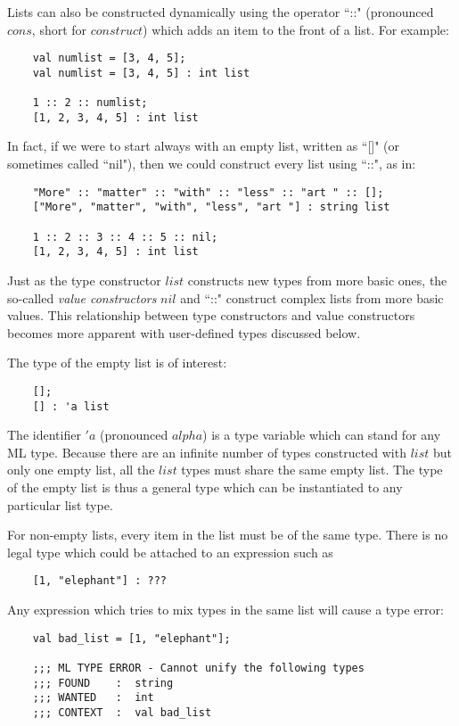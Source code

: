 Lists can also be constructed dynamically using the operator ``::"
(pronounced $cons$, short for $construct$) which adds an item to the
front of a list. For example:
\begin{verbatim}
    val numlist = [3, 4, 5];
    val numlist = [3, 4, 5] : int list

    1 :: 2 :: numlist;
    [1, 2, 3, 4, 5] : int list
\end{verbatim}

In fact, if we were to start always with an empty list, written as ``[]"
(or sometimes called ``nil"), then we could construct every list using
``::", as in:
\begin{verbatim}
    "More" :: "matter" :: "with" :: "less" :: "art " :: [];
    ["More", "matter", "with", "less", "art "] : string list

    1 :: 2 :: 3 :: 4 :: 5 :: nil;
    [1, 2, 3, 4, 5] : int list
\end{verbatim}

Just as the type constructor $list$ constructs new types from more basic
ones, the so-called {\em value constructors} $nil$ and ``::" construct
complex lists from more basic values. This relationship between type
constructors and value constructors becomes more apparent with
user-defined types discussed below.

The type of the empty list is of interest:
\begin{verbatim}
    [];
    [] : 'a list
\end{verbatim}

The identifier $'a$ (pronounced $alpha$) is a type variable which can
stand for any ML type. Because there are an infinite number of types
constructed with $list$ but only one empty list, all the $list$ types
must share the same empty list. The type of the empty list is thus a
general type which can be instantiated to any particular list type.

For non-empty lists, every item in the list must be of the same type.
There is no legal type which could be attached to an expression such as
\begin{verbatim}
    [1, "elephant"] : ???
\end{verbatim}

Any expression which tries to mix types in the same list will cause a
type error:
\begin{verbatim}
    val bad_list = [1, "elephant"];

    ;;; ML TYPE ERROR - Cannot unify the following types
    ;;; FOUND    :  string
    ;;; WANTED   :  int
    ;;; CONTEXT  :  val bad_list
\end{verbatim}

